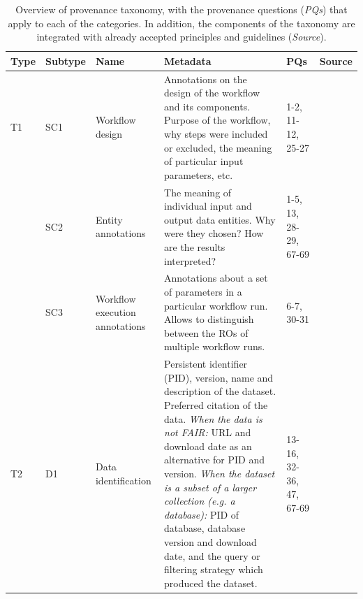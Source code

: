 \begin{table}
\caption{Overview of provenance taxonomy, with the provenance questions (\emph{PQs}) that apply to each of the categories. In addition, the components of the taxonomy are integrated with already accepted principles and guidelines (\emph{Source}).
}\label{tab:renske:taxonomy}

\begin{tabularx}{\linewidth}{p{0.1in}p{0.3in}p{1.3in}Lp{0.45in}p{0.3in}} %
\toprule
{Type} & {Subtype} & {Name} & {Metadata}  & {PQs} & {Source} \\
\midrule
T1  & {SC1}\label{renske:tax:sc1}   & Workflow design  & Annotations on the design of the workflow and its components. Purpose of the workflow, why steps were included or excluded, the meaning of particular input parameters, etc.    & 1-2, 11-12, 25-27    & \citep{committeeonreproducibilityandreplicabilityinscienceReproducibilityReplicabilityScience2019,belhajjameResearchObjectSuite2014,gryk_workflows_2017,stodden_2016}   \\
    & SC2   & Entity annotations                & The meaning of individual input and output data entities. Why were they chosen? How are the results interpreted?          & 1-5, 13, 28-29, 67-69  &   \\
    & SC3   & Workflow execution annotations    & Annotations about a set of parameters in a particular workflow run. Allows to distinguish between the ROs of multiple workflow runs.             & 6-7, 30-31 &  \\
\midrule
T2  & D1    & Data identification               & Persistent identifier (PID), version, name and description of the dataset. Preferred citation of the data. \emph{When the data is not FAIR:} URL and download date as an alternative for PID and version. \emph{When the dataset is a subset of a larger collection (e.g. a database):} PID of database, database version and download date, and the query or filtering strategy which produced the dataset.    & 13-16, 32-36, 47, 67-69 & \citep{datacitationsynthesisgroupJointDeclarationData2014} \\

\end{tabularx}
\end{table}
